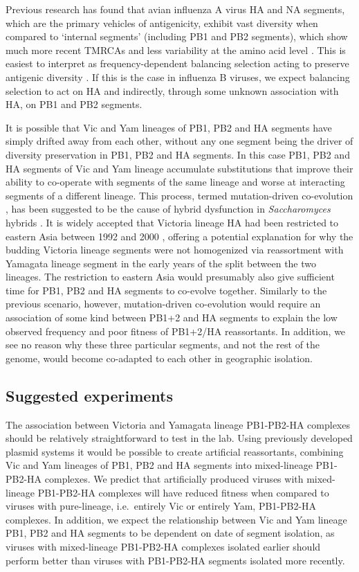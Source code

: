 \documentclass[11pt,oneside,letterpaper]{article}
\begin{document}
Previous research has found that avian influenza A virus HA and NA segments, which are the primary vehicles of antigenicity, exhibit vast diversity when compared to `internal segments' (including PB1 and PB2 segments), which show much more recent TMRCAs and less variability at the amino acid level \cite{chen2006,obenauer2006}.
This is easiest to interpret as frequency-dependent balancing selection acting to preserve antigenic diversity \cite{worobey2014}.
If this is the case in influenza B viruses, we expect balancing selection to act on HA and indirectly, through some unknown association with HA, on PB1 and PB2 segments.

It is possible that Vic and Yam lineages of PB1, PB2 and HA segments have simply drifted away from each other, without any one segment being the driver of diversity preservation in PB1, PB2 and HA segments.
In this case PB1, PB2 and HA segments of Vic and Yam lineage accumulate substitutions that improve their ability to co-operate with segments of the same lineage and worse at interacting segments of a different lineage.
This process, termed mutation-driven co-evolution \cite{presgraves2010}, has been suggested to be the cause of hybrid dysfunction in \textit{Saccharomyces} hybrids \cite{lee2008}.
It is widely accepted that Victoria lineage HA had been restricted to eastern Asia between 1992 and 2000 \cite{nerome1998,shaw2002}, offering a potential explanation for why the budding Victoria lineage segments were not homogenized via reassortment with Yamagata lineage segment in the early years of the split between the two lineages. 
The restriction to eastern Asia would presumably also give sufficient time for PB1, PB2 and HA segments to co-evolve together.
Similarly to the previous scenario, however, mutation-driven co-evolution would require an association of some kind between PB1+2 and HA segments to explain the low observed frequency and poor fitness of PB1+2/HA reassortants.
In addition, we see no reason why these three particular segments, and not the rest of the genome, would become co-adapted to each other in geographic isolation.

\subsection*{Suggested experiments}
The association between Victoria and Yamagata lineage PB1-PB2-HA complexes should be relatively straightforward to test in the lab.
Using previously developed plasmid systems \cite{hoffmann2002} it would be possible to create artificial reassortants, combining Vic and Yam lineages of PB1, PB2 and HA segments into mixed-lineage PB1-PB2-HA complexes.
We predict that artificially produced viruses with mixed-lineage PB1-PB2-HA complexes will have reduced fitness when compared to viruses with pure-lineage, i.e.\ entirely Vic or entirely Yam, PB1-PB2-HA complexes.
In addition, we expect the relationship between Vic and Yam lineage PB1, PB2 and HA segments to be dependent on date of segment isolation, as viruses with mixed-lineage PB1-PB2-HA complexes isolated earlier should perform better than viruses with PB1-PB2-HA segments isolated more recently.
\end{document}
